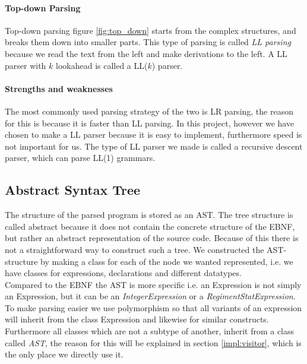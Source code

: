 	\paragraph{Top-down Parsing}
		Top-down parsing figure \ref{fig:top_down} starts from the complex structures, and breaks them down into smaller parts.
		This type of parsing is called {\it LL parsing} because we read the text from the left and make derivations to the left.
		A LL parser with $k$ lookahead is called a LL($k$) parser.
	\paragraph{Strengths and weaknesses}
		The most commonly used parsing strategy of the two is LR parsing, the reason for this is because it is faster than LL parsing.
		In this project, however we have chosen to make a LL parser because it is easy to implement, furthermore speed is not important for us. 
		The type of LL parser we made is called a recursive descent parser, which can parse LL(1) grammars.
		
	\subsection{Abstract Syntax Tree}
		\label{ast}
		The structure of the parsed program is stored as an AST. The tree structure is called abstract because it does not contain the concrete
		structure of the EBNF, but rather an abstract representation of the source code. Because of this there is not a straightforward way to 
		construct such a tree.  We constructed the AST-structure by making a class for each of the node we wanted represented, i.e. we have 
		classes for expressions, declarations and different datatypes. \\
		
		Compared to the EBNF the AST is more specific i.e. an Expression 
		is not simply an Expression, but it can be an {\it IntegerExpression} or a {\it RegimentStatExpression}. 
		To make parsing easier we use polymorphism so that all variants of an expression 
		will inherit from the class Expression and likewise for similar constructs. 
		Furthermore all classes which are not a subtype of another, inherit from a class called {\it AST}, 
		the reason for this will be explained in section \ref{impl:visitor}, which is the only place we directly use it.
		
